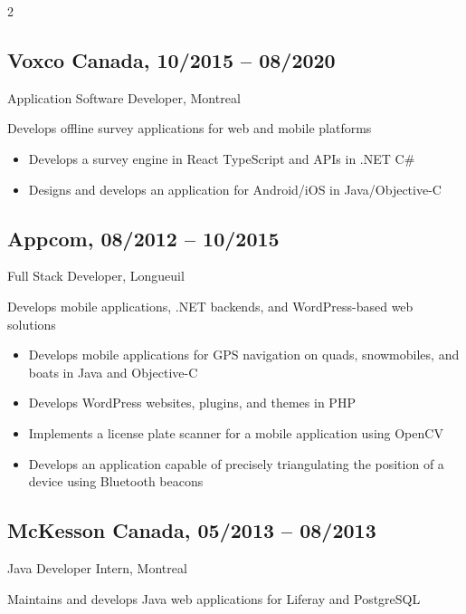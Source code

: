 \documentclass{article}
\begin{document}
\begin{paracol}{2}
\begin{rightcolumn}
    \subsection{Voxco Canada, 10/2015 -- 08/2020}
    {Application Software Developer, Montreal\par}
    {
      Develops offline survey applications for web and mobile platforms
    \par}
    \begin{itemize}
      \item Develops a survey engine in React TypeScript and APIs in .NET C\#
      \item Designs and develops an application for Android/iOS in Java/Objective-C
    \end{itemize}

    \vspace{1em}

    \subsection{Appcom, 08/2012 -- 10/2015}
    {Full Stack Developer, Longueuil\par}
    {
      Develops mobile applications, .NET backends, and WordPress-based web solutions
    \par}
    \begin{itemize}
      \item Develops mobile applications for GPS navigation on quads, snowmobiles, and boats in Java and Objective-C
      \item Develops WordPress websites, plugins, and themes in PHP
      \item Implements a license plate scanner for a mobile application using OpenCV
      \item Develops an application capable of precisely triangulating the position of a device using Bluetooth beacons
    \end{itemize}

    \vspace{1em}

    \subsection{McKesson Canada, 05/2013 -- 08/2013}
    {Java Developer Intern, Montreal\par}
    {
      Maintains and develops Java web applications for Liferay and PostgreSQL
    \par}

    \flushpage

  \end{rightcolumn}
\end{paracol}
\end{document}
